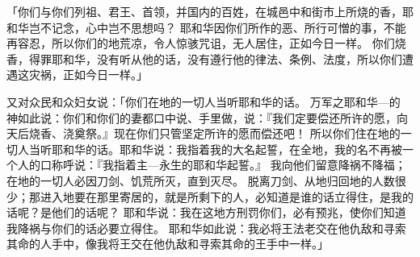 {「你们与你们列祖、君王、首领，并国内的百姓，在{}城邑中和{}街市上所烧的香，耶和华岂不记念，心中岂不思想吗？
耶和华因你们所作的恶、所行可憎的事，不能再容忍，所以你们的地荒凉，令人惊骇咒诅，无人居住，正如今日一样。
你们烧香，得罪耶和华，没有听从他的话，没有遵行他的律法、条例、法度，所以你们遭遇这灾祸，正如今日一样。」
\par }{\PP {}又对众民和众妇女说：「你们在{}地的一切{}人当听耶和华的话。
万军之耶和华—{}的　神如此说：你们和你们的妻都口中说、手里做，说：『我们定要偿还所许的愿，向天后烧香、浇奠祭。』现在你们只管坚定所许的愿而偿还吧！
所以你们住在{}地的一切{}人当听耶和华的话。耶和华说：我指着我的大名起誓，在{}全地，我的名不再被{}一个人的口称呼说：『我指着主—永生的耶和华起誓。』
我向他们留意降祸不降福；在{}地的一切{}人必因刀剑、饥荒所灭，直到灭尽。
脱离刀剑、从{}地归回{}地的人数很少；那进入{}地要在那里寄居的，就是所剩下的{}人，必知道是谁的话立得住，是我的话呢？是他们的话呢？
耶和华说：我在这地方刑罚你们，必有预兆，使你们知道我降祸与你们的话必要立得住。
耶和华如此说：我必将{}王法老{}交在他仇敌和寻索其命的人手中，像我将{}王{}交在他仇敌和寻索其命的{}王{}手中一样。」

\par }
